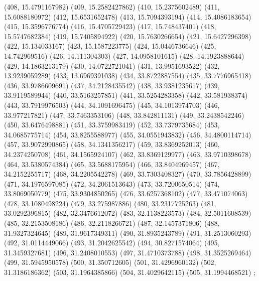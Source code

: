 {					(408, 15.4791167982)
					(409, 15.2582427862)
					(410, 15.2375602489)
					(411, 15.6088180972)
					(412, 15.6531652478)
					(413, 15.7094393194)
					(414, 15.4086183654)
					(415, 15.3596776774)
					(416, 15.4705729423)
					(417, 15.748437401)
					(418, 15.5747682384)
					(419, 15.7405894922)
					(420, 15.7630266654)
					(421, 15.6427296398)
					(422, 15.134033167)
					(423, 15.1587223775)
					(424, 15.0446736646)
					(425, 14.742969516)
					(426, 14.111304303)
					(427, 14.0958101615)
					(428, 14.1923888644)
					(429, 14.1863213179)
					(430, 14.0722721041)
					(431, 13.9951693522)
					(432, 13.9239059289)
					(433, 13.6969391038)
					(434, 33.8722887554)
					(435, 33.7776965418)
					(436, 33.9786609691)
					(437, 34.2128435542)
					(438, 33.9381235617)
					(439, 33.9119589944)
					(440, 33.5163257851)
					(441, 33.5254283358)
					(442, 33.581938374)
					(443, 33.7919976503)
					(444, 34.1091696475)
					(445, 34.1013974703)
					(446, 33.977217821)
					(447, 33.7463353106)
					(448, 33.842811131)
					(449, 33.2438542246)
					(450, 33.6476498881)
					(451, 33.3759983419)
					(452, 33.7379735684)
					(453, 34.0685775714)
					(454, 33.8255588977)
					(455, 34.0551943832)
					(456, 34.4800114714)
					(457, 33.9072990865)
					(458, 34.1341356217)
					(459, 33.8369252013)
					(460, 34.2374250708)
					(461, 34.1565924107)
					(462, 33.8369129977)
					(463, 33.9710398678)
					(464, 33.5380574384)
					(465, 33.5688175954)
					(466, 33.8404969457)
					(467, 34.2152255717)
					(468, 34.2205542278)
					(469, 33.7303408327)
					(470, 33.7856428899)
					(471, 34.1976597085)
					(472, 34.2061513643)
					(473, 33.7200650514)
					(474, 33.8069050779)
					(475, 33.9304850265)
					(476, 33.6257368102)
					(477, 33.471074063)
					(478, 33.1080498224)
					(479, 33.275987886)
					(480, 33.2317725263)
					(481, 33.0292396815)
					(482, 32.3476612072)
					(483, 32.1138223573)
					(484, 32.5011608539)
					(485, 32.2153508186)
					(486, 32.2118266721)
					(487, 32.1457371806)
					(488, 31.9327324645)
					(489, 31.9617349311)
					(490, 31.8935243789)
					(491, 31.2513060293)
					(492, 31.0114449066)
					(493, 31.2042625542)
					(494, 30.8271574064)
					(495, 31.3459327681)
					(496, 31.2408010553)
					(497, 31.4710373788)
					(498, 31.3525269464)
					(499, 31.5945950578)
					(500, 31.350712605)
					(501, 31.4296960132)
					(502, 31.3186186362)
					(503, 31.1964385866)
					(504, 31.4029642115)
					(505, 31.1994468521)
				};
